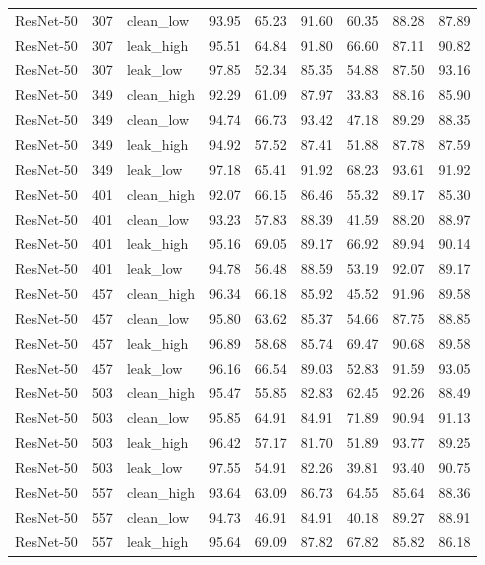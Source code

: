 {\begin{longtable}{lrlrrrrrr}
ResNet-50 & 307 & clean\_low & 93.95 & 65.23 & 91.60 & 60.35 & 88.28 & 87.89 \\
ResNet-50 & 307 & leak\_high & 95.51 & 64.84 & 91.80 & 66.60 & 87.11 & 90.82 \\
ResNet-50 & 307 & leak\_low & 97.85 & 52.34 & 85.35 & 54.88 & 87.50 & 93.16 \\
ResNet-50 & 349 & clean\_high & 92.29 & 61.09 & 87.97 & 33.83 & 88.16 & 85.90 \\
ResNet-50 & 349 & clean\_low & 94.74 & 66.73 & 93.42 & 47.18 & 89.29 & 88.35 \\
ResNet-50 & 349 & leak\_high & 94.92 & 57.52 & 87.41 & 51.88 & 87.78 & 87.59 \\
ResNet-50 & 349 & leak\_low & 97.18 & 65.41 & 91.92 & 68.23 & 93.61 & 91.92 \\
ResNet-50 & 401 & clean\_high & 92.07 & 66.15 & 86.46 & 55.32 & 89.17 & 85.30 \\
ResNet-50 & 401 & clean\_low & 93.23 & 57.83 & 88.39 & 41.59 & 88.20 & 88.97 \\
ResNet-50 & 401 & leak\_high & 95.16 & 69.05 & 89.17 & 66.92 & 89.94 & 90.14 \\
ResNet-50 & 401 & leak\_low & 94.78 & 56.48 & 88.59 & 53.19 & 92.07 & 89.17 \\
ResNet-50 & 457 & clean\_high & 96.34 & 66.18 & 85.92 & 45.52 & 91.96 & 89.58 \\
ResNet-50 & 457 & clean\_low & 95.80 & 63.62 & 85.37 & 54.66 & 87.75 & 88.85 \\
ResNet-50 & 457 & leak\_high & 96.89 & 58.68 & 85.74 & 69.47 & 90.68 & 89.58 \\
ResNet-50 & 457 & leak\_low & 96.16 & 66.54 & 89.03 & 52.83 & 91.59 & 93.05 \\
ResNet-50 & 503 & clean\_high & 95.47 & 55.85 & 82.83 & 62.45 & 92.26 & 88.49 \\
ResNet-50 & 503 & clean\_low & 95.85 & 64.91 & 84.91 & 71.89 & 90.94 & 91.13 \\
ResNet-50 & 503 & leak\_high & 96.42 & 57.17 & 81.70 & 51.89 & 93.77 & 89.25 \\
ResNet-50 & 503 & leak\_low & 97.55 & 54.91 & 82.26 & 39.81 & 93.40 & 90.75 \\
ResNet-50 & 557 & clean\_high & 93.64 & 63.09 & 86.73 & 64.55 & 85.64 & 88.36 \\
ResNet-50 & 557 & clean\_low & 94.73 & 46.91 & 84.91 & 40.18 & 89.27 & 88.91 \\
ResNet-50 & 557 & leak\_high & 95.64 & 69.09 & 87.82 & 67.82 & 85.82 & 86.18 \\

\end{longtable}}
